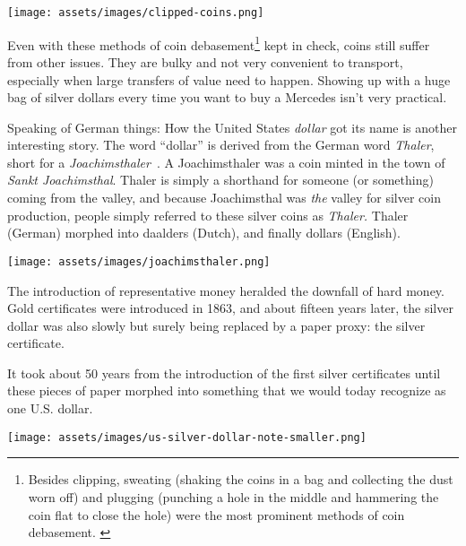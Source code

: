\begin{center}
  \texttt{[image: assets/images/clipped-coins.png]}
  \label{fig:clipped-coins}
\end{center}

Even with these methods of coin debasement\footnote{Besides clipping, sweating
(shaking the coins in a bag and collecting the dust worn off) and plugging
(punching a hole in the middle and hammering the coin flat to close the hole)
were the most prominent methods of coin debasement. \cite{wiki:coin-debasement}}
kept in check, coins still suffer from other issues. They are bulky and not very
convenient to transport, especially when large transfers of value need to
happen. Showing up with a huge bag of silver dollars every time you want to buy
a Mercedes isn't very practical.

Speaking of German things: How the United States \textit{dollar} got its name is
another interesting story. The word \enquote{dollar} is derived from the German word
\textit{Thaler}, short for a \textit{Joachimsthaler}~\cite{wiki:thaler}. A
Joachimsthaler was a coin minted in the town of \textit{Sankt Joachimsthal}.
Thaler is simply a shorthand for someone (or something) coming from the valley,
and because Joachimsthal was \textit{the} valley for silver coin production,
people simply referred to these silver coins as \textit{Thaler.} Thaler (German)
morphed into daalders (Dutch), and finally dollars (English).

\begin{center}
  \centering
  \texttt{[image: assets/images/joachimsthaler.png]}
  \label{fig:joachimsthaler}
\end{center}

The introduction of representative money heralded the downfall of hard
money. Gold certificates were introduced in 1863, and about fifteen
years later, the silver dollar was also slowly but surely being replaced
by a paper proxy: the silver certificate. \cite{wiki:silver-certificate}

It took about 50 years from the introduction of the first silver
certificates until these pieces of paper morphed into something that we
would today recognize as one U.S. dollar.

\begin{center}
  \centering
  \texttt{[image: assets/images/us-silver-dollar-note-smaller.png]}
  \label{fig:us-silver-dollar-note-smaller}
\end{center}


